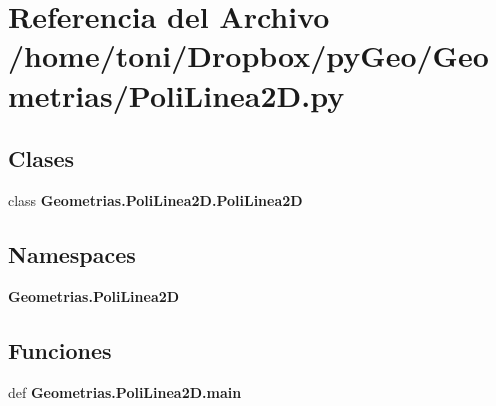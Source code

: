 \section{Referencia del Archivo /home/toni/\-Dropbox/py\-Geo/\-Geometrias/\-Poli\-Linea2\-D.py}
\label{PoliLinea2D_8py}
\subsection*{Clases}
\begin{DoxyCompactItemize}
\item 
class {\bf Geometrias.\-Poli\-Linea2\-D.\-Poli\-Linea2\-D}
\end{DoxyCompactItemize}
\subsection*{Namespaces}
\begin{DoxyCompactItemize}
\item 
{\bf Geometrias.\-Poli\-Linea2\-D}
\end{DoxyCompactItemize}
\subsection*{Funciones}
\begin{DoxyCompactItemize}
\item 
def {\bf Geometrias.\-Poli\-Linea2\-D.\-main}
\end{DoxyCompactItemize}
